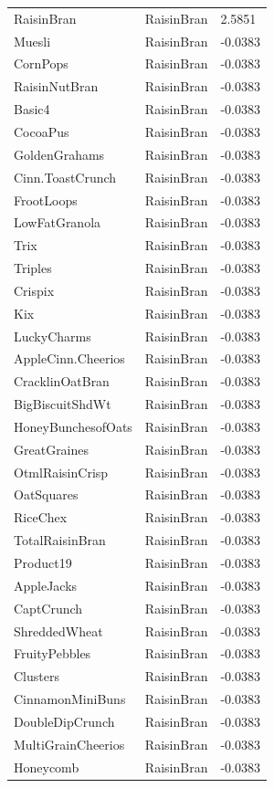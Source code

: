 \begin{table}[!htbp]
\begin{tabular}{lll}
RaisinBran & RaisinBran & 2.5851
\\
Muesli & RaisinBran & -0.0383
\\
CornPops & RaisinBran & -0.0383
\\
RaisinNutBran & RaisinBran & -0.0383
\\
Basic4 & RaisinBran & -0.0383
\\
CocoaPus & RaisinBran & -0.0383
\\
GoldenGrahams & RaisinBran & -0.0383
\\
Cinn.ToastCrunch & RaisinBran & -0.0383
\\
FrootLoops & RaisinBran & -0.0383
\\
LowFatGranola & RaisinBran & -0.0383
\\
Trix & RaisinBran & -0.0383
\\
Triples & RaisinBran & -0.0383
\\
Crispix & RaisinBran & -0.0383
\\
Kix & RaisinBran & -0.0383
\\
LuckyCharms & RaisinBran & -0.0383
\\
AppleCinn.Cheerios & RaisinBran & -0.0383
\\
CracklinOatBran & RaisinBran & -0.0383
\\
BigBiscuitShdWt & RaisinBran & -0.0383
\\
HoneyBunchesofOats & RaisinBran & -0.0383
\\
GreatGraines & RaisinBran & -0.0383
\\
OtmlRaisinCrisp & RaisinBran & -0.0383
\\
OatSquares & RaisinBran & -0.0383
\\
RiceChex & RaisinBran & -0.0383
\\
TotalRaisinBran & RaisinBran & -0.0383
\\
Product19 & RaisinBran & -0.0383
\\
AppleJacks & RaisinBran & -0.0383
\\
CaptCrunch & RaisinBran & -0.0383
\\
ShreddedWheat & RaisinBran & -0.0383
\\
FruityPebbles & RaisinBran & -0.0383
\\
Clusters & RaisinBran & -0.0383
\\
CinnamonMiniBuns & RaisinBran & -0.0383
\\
DoubleDipCrunch & RaisinBran & -0.0383
\\
MultiGrainCheerios & RaisinBran & -0.0383
\\
Honeycomb & RaisinBran & -0.0383

\end{tabular}
\end{table}
